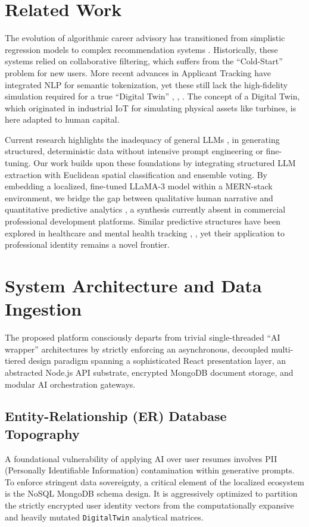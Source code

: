 \documentclass[conference]{IEEEtran}
\begin{document}
\section{Related Work}
The evolution of algorithmic career advisory has transitioned from simplistic regression models to complex recommendation systems \cite{b14}. Historically, these systems relied on collaborative filtering, which suffers from the ``Cold-Start'' problem for new users. More recent advances in Applicant Tracking have integrated NLP for semantic tokenization, yet these still lack the high-fidelity simulation required for a true ``Digital Twin'' \cite{b9}, \cite{b10}, \cite{b21}. The concept of a Digital Twin, which originated in industrial IoT for simulating physical assets like turbines, is here adapted to human capital. 

Current research highlights the inadequacy of general LLMs \cite{b8}, \cite{b6} in generating structured, deterministic data without intensive prompt engineering or fine-tuning. Our work builds upon these foundations by integrating structured LLM extraction with Euclidean spatial classification and ensemble voting. By embedding a localized, fine-tuned LLaMA-3 model within a MERN-stack environment, we bridge the gap between qualitative human narrative and quantitative predictive analytics \cite{b23}, a synthesis currently absent in commercial professional development platforms. Similar predictive structures have been explored in healthcare and mental health tracking \cite{b26}, \cite{b27}, yet their application to professional identity remains a novel frontier.

\section{System Architecture and Data Ingestion}
The proposed platform consciously departs from trivial single-threaded ``AI wrapper'' architectures by strictly enforcing an asynchronous, decoupled multi-tiered design paradigm spanning a sophisticated React presentation layer, an abstracted Node.js API substrate, encrypted MongoDB document storage, and modular AI orchestration gateways.

\subsection{Entity-Relationship (ER) Database Topography}
A foundational vulnerability of applying AI over user resumes involves PII (Personally Identifiable Information) contamination within generative prompts. To enforce stringent data sovereignty, a critical element of the localized ecosystem is the NoSQL MongoDB schema design. It is aggressively optimized to partition the strictly encrypted user identity vectors from the computationally expansive and heavily mutated \texttt{DigitalTwin} analytical matrices.
\end{document}
